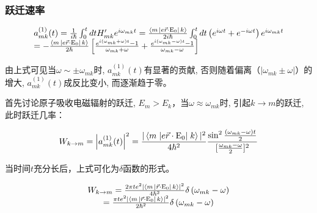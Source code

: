 \subsubsection{跃迁速率}


\begin{equation}\label{25-3}
\begin{array}{l}
 a_{mk}^{(1)} (t) = \frac{1}{{i\hbar }}\int_0^t {dtH'_{mk} e^{i\omega _{mk} t} }  = \frac{{\left\langle m \right.\left| {e {\vec r} \cdot {\rm E}_0 } \right|\left. k \right\rangle }}{{2i\hbar }}\int_0^t {dt\left( {e^{i\omega t}  + e^{ - i\omega t} } \right)e^{i\omega _{mk} t} }  \\
  =  - \frac{{\left\langle m \right.\left| {e {\vec r} \cdot {\rm E}_0 } \right|\left. k \right\rangle }}{{2\hbar }}\left[ {\frac{{e^{i(\omega _{mk}  + \omega )t}  - 1}}{{\omega _{mk}  + \omega }} + \frac{{e^{i(\omega _{mk}  - \omega )t}  - 1}}{{\omega _{mk}  - \omega }}} \right] \\
 \end{array}
\end{equation}

由上式可见当$\omega  \sim  \pm \omega _{mk} $时, $a_{mk}^{(1)}
(t)$有显著的贡献, 否则随着偏离（$\left| {\omega _{mk}  \pm \omega }
\right|$）的增大, $a_{mk}^{(1)} (t)$成反比变小, 而逐渐趋于零。


首先讨论原子吸收电磁辐射的跃迁, $E_m  > E_k $，当$\omega  \approx
\omega _{mk} $时, 引起$k \to m$的跃迁, 此时跃迁几率：

\begin{equation}\label{25-4}
 W_{k \to m} = \left| {a_{mk}^{(1)} (t)} \right|^2  = \frac{{| \left\langle m \right.\left| {e {\vec r} \cdot {\rm E}_0 } \right|\left. k \right\rangle |^2 }}{{4\hbar ^2 }}\frac{{\sin ^2 {\textstyle{{(\omega _{mk}  - \omega )t} \over 2}}}}{{[{\textstyle{{\omega _{mk}  - \omega } \over 2}}]^2 }}
\end{equation}

当时间$t$充分长后，上式可化为$\delta$函数的形式。

\begin{equation}\label{25-5}
\begin{array}{c}
W_{k \to m}  = \frac{{2\pi te^2 | \left\langle m \right.\left| {
{\vec r} \cdot {\rm E}_0 } \right|\left. k \right\rangle |^2
}}{{4\hbar ^2 }}\delta \left( {\omega _{mk}  - \omega } \right) \\
= \frac{{\pi te^2 | \left\langle m \right.\left| { {\vec r} \cdot {\rm
E}_0 } \right|\left. k \right\rangle |^2 }}{{2\hbar ^2 }}\delta
\left( {\omega _{mk}  - \omega } \right)\\
\end{array}
\end{equation}

